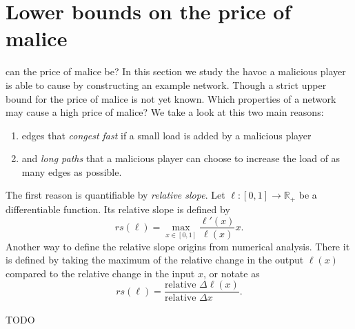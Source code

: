 \section{Lower bounds on the price of malice}

 can the price of malice be?
In this section we study the havoc a malicious player is able to cause by constructing an example network.
Though a strict upper bound for the price of malice is not yet known.
Which properties of a network may cause a high price of malice?
We take a look at this two main reasons:
\begin{enumerate}
	\item edges that \emph{congest fast} if a small load is added by a malicious player
	\item and \emph{long paths} that a malicious player can choose to increase the load of as many edges as possible.
\end{enumerate}
The first reason is quantifiable by \emph{relative slope}.
Let $\ell \colon [0,1] \to \mathbb R_+$ be a differentiable function.
Its relative slope is defined by \[
rs(\ell) = \max_{x \in [0,1]} \dfrac{\ell'(x)}{\ell(x)}x .\]
Another way to define the relative slope origins from numerical analysis. 
There it is defined by taking the maximum of the relative change in the output $\ell(x)$ compared to the relative change in the input $x$, 
or notate as 
\[ rs(\ell) = \dfrac{\text{relative } \Delta \ell(x)}{\text{relative } \Delta x \phantom{\ell()}} .\]

TODO

